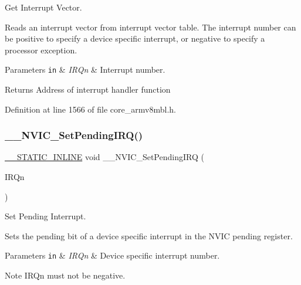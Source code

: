 Get Interrupt Vector. 

Reads an interrupt vector from interrupt vector table. The interrupt number can be positive to specify a device specific interrupt, or negative to specify a processor exception. 
\begin{DoxyParams}[1]{Parameters}
\mbox{\tt in}  & {\em I\+R\+Qn} & Interrupt number. \\
\hline
\end{DoxyParams}
\begin{DoxyReturn}{Returns}
Address of interrupt handler function 
\end{DoxyReturn}


Definition at line 1566 of file core\+\_\+armv8mbl.\+h.

\mbox{\label{group___c_m_s_i_s___core___n_v_i_c_functions_gaabefdd4b790b9a7308929938c0c1e1ad}} 
\subsubsection{\texorpdfstring{\+\_\+\+\_\+\+N\+V\+I\+C\+\_\+\+Set\+Pending\+I\+R\+Q()}{\_\_NVIC\_SetPendingIRQ()}}
{\footnotesize\ttfamily \hyperlink{cmsis__iccarm_8h_aba87361bfad2ae52cfe2f40c1a1dbf9c}{\+\_\+\+\_\+\+S\+T\+A\+T\+I\+C\+\_\+\+I\+N\+L\+I\+NE} void \+\_\+\+\_\+\+N\+V\+I\+C\+\_\+\+Set\+Pending\+I\+RQ (\begin{DoxyParamCaption}\item[{\hyperlink{group___c_m_s_i_s__18_x_x___i_r_q_gaa44deabd252bda567898bae35a086adc}{I\+R\+Qn\+\_\+\+Type}}]{I\+R\+Qn }\end{DoxyParamCaption})}



Set Pending Interrupt. 

Sets the pending bit of a device specific interrupt in the N\+V\+IC pending register. 
\begin{DoxyParams}[1]{Parameters}
\mbox{\tt in}  & {\em I\+R\+Qn} & Device specific interrupt number. \\
\hline
\end{DoxyParams}
\begin{DoxyNote}{Note}
I\+R\+Qn must not be negative. 
\end{DoxyNote}


